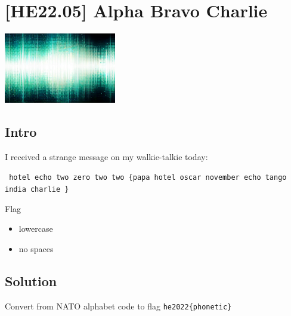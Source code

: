 
\hypertarget{he22.05}{%
\chapter{[HE22.05] Alpha Bravo Charlie}\label{he22.05}}


\begin{marginfigure}
	\includegraphics[width=49mm]{level2/challenge5.jpg}
\end{marginfigure}
\section{Intro}
I received a strange message on my walkie-talkie today:

\noindent
\texttt{%
hotel echo two zero two two \{papa hotel oscar november echo tango india charlie \}}

 Flag
\begin{itemize}
	\item    lowercase
	\item    no spaces
\end{itemize} 

\section{Solution}\label{hv21.05-solution}

Convert from NATO alphabet code to flag \verb+he2022{phonetic}+

